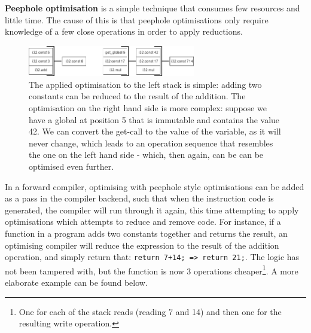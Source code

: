 \documentclass[a4paper]{article}
\begin{document}
\textbf{Peephole optimisation} is a simple technique that consumes few resources and little time. The cause of this is that peephole optimisations only require knowledge of a few close operations in order to apply reductions.

\begin{figure}[H]
	\includegraphics[width=0.65\textwidth]{PeepholeOptimisationIllustrations}
	\centering
	\caption{The applied optimisation to the left stack is simple: adding two constants can be reduced to the result of the addition. The optimisation on the right hand side is more complex: suppose we have a global at position 5 that is immutable and contains the value 42. We can convert the get-call to the value of the variable, as it will never change, which leads to an operation sequence that resembles the one on the left hand side - which, then again, can be can be optimised even further.}
\end{figure}

In a forward compiler, optimising with peephole style optimisations can be added as a pass in the compiler backend, such that when the instruction code is generated, the compiler will run through it again, this time attempting to apply optimisations which attempts to reduce and remove code. For instance, if a function in a program adds two constants together and returns the result, an optimising compiler will reduce the expression to the result of the addition operation, and simply return that: \texttt{return 7+14; => return 21;}. The logic has not been tampered with, but the function is now 3 operations cheaper\footnote{One for each of the stack reads (reading 7 and 14) and then one for the resulting write operation.}. A more elaborate example can be found below.
\end{document}
